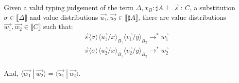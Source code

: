\documentclass[runningheads,orivec,envcountsame,envcountsect]{llncs}
\newcommand\lra{\longrightarrow}
\newcommand\ansubst[2]{\ensuremath{\langle #1 \rangle_{#2}}}
\def\scal#1#2{\langle{#1}~|~{#2}\rangle}
\def\eval{\lra^*}
\def\sem#1{\llbracket#1\rrbracket}
\def\TYP#1#2#3{#1~{\vdash}~#2~{:}~#3}
\begin{document}
\begin{lemma}\label{lem:InnerProdSingleVar} %
Given a valid typing judgement of the term $\TYP{\Delta,x_B:\sharp A}{\vec{s}}{C}$, a substitution $\sigma\in\sem{\Delta}$ and value distributions $\vec{u_1},\vec{u_2}\in\sem{\sharp A}$, there are value distributions $\vec{w_1}, \vec{w_2}\in\sem{C}$ such that:
\[
\begin{array}{c}
    \vec{s}\ansubst{\sigma}{}\ansubst{\vec{u_1}/x}{B_1}{\ansubst{\vec{v_1}/y}{B_2}}\eval\vec{w_1}\\
    \vec{s}\ansubst{\sigma}{}\ansubst{\vec{u_2}/x}{B_1}{\ansubst{\vec{v_2}/y}{B_2}}\eval\vec{w_2}\\
\end{array}
\]

And, $\scal{\vec{w_1}}{\vec{w_2}} = \scal{\vec{u_1}}{\vec{u_2}}$.
\end{lemma}
\end{document}
